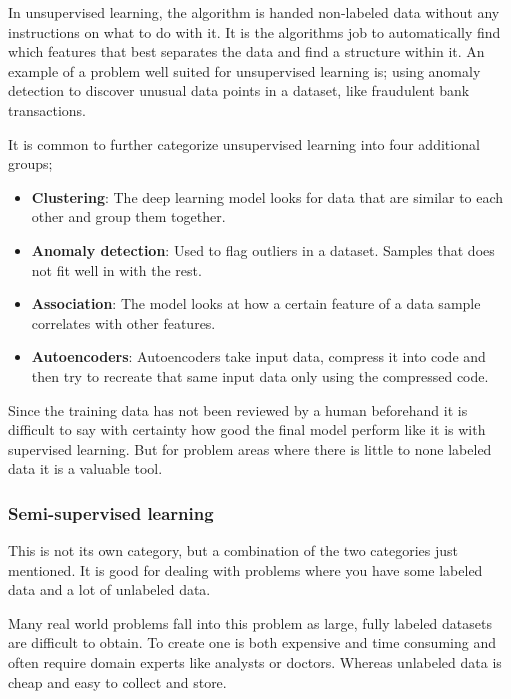 \documentclass[thesis.tex]{subfiles}
\begin{document}
In unsupervised learning, the algorithm is handed non-labeled data without any instructions on what to do with it. It is the algorithms job to automatically find which features that best separates the data and find a structure within it.	An example of a problem well suited for unsupervised learning is; using anomaly detection to discover unusual data points in a dataset, like fraudulent bank transactions.

It is common to further categorize unsupervised learning into four additional groups;

\begin{itemize}
\item \textbf{Clustering}: The deep learning model looks for data that are similar to each other and group them together.
\item \textbf{Anomaly detection}: Used to flag outliers in a dataset. Samples that does not fit well in with the rest.
\item \textbf{Association}: The model looks at how a certain feature of a data sample correlates with other features.
\item \textbf{Autoencoders}: Autoencoders take input data, compress it into code and then try to recreate that same input data only using the compressed code.
\end{itemize}

Since the training data has not been reviewed by a human beforehand it is difficult to say with certainty how good the final model perform like it is with supervised learning. But for problem areas where there is little to none labeled data it is a valuable tool.


\subsubsection{Semi-supervised learning} \label{semi_supervised_learning}
This is not its own category, but a combination of the two categories just mentioned. It is good for dealing with problems where you have some labeled data and a lot of unlabeled data.

Many real world problems fall into this problem as large, fully labeled datasets are difficult to obtain. To create one is both expensive and time consuming and often require domain experts like analysts or doctors. Whereas unlabeled data is cheap and easy to collect and store.
\end{document}
